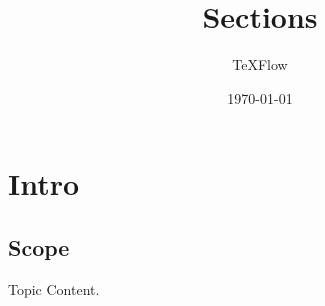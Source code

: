 \documentclass[aspectratio=43]{beamer}
\title{Sections}
\author{TeXFlow}
\date{\today}
\begin{document}
\section{Intro}
\subsection{Scope}

\begin{frame}{Topic}
Content.
\end{frame}
\end{document}
